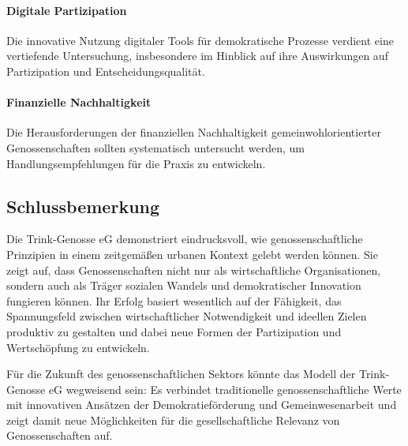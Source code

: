 \paragraph{Digitale Partizipation}
Die innovative Nutzung digitaler Tools für demokratische Prozesse verdient eine vertiefende Untersuchung, insbesondere im Hinblick auf ihre Auswirkungen auf Partizipation und Entscheidungsqualität.

\paragraph{Finanzielle Nachhaltigkeit}
Die Herausforderungen der finanziellen Nachhaltigkeit gemeinwohlorientierter Genossenschaften sollten systematisch untersucht werden, um Handlungsempfehlungen für die Praxis zu entwickeln.

\subsection{Schlussbemerkung}

Die Trink-Genosse eG demonstriert eindrucksvoll, wie genossenschaftliche Prinzipien in einem zeitgemäßen urbanen Kontext gelebt werden können. Sie zeigt auf, dass Genossenschaften nicht nur als wirtschaftliche Organisationen, sondern auch als Träger sozialen Wandels und demokratischer Innovation fungieren können. Ihr Erfolg basiert wesentlich auf der Fähigkeit, das Spannungsfeld zwischen wirtschaftlicher Notwendigkeit und ideellen Zielen produktiv zu gestalten und dabei neue Formen der Partizipation und Wertschöpfung zu entwickeln.

Für die Zukunft des genossenschaftlichen Sektors könnte das Modell der Trink-Genosse eG wegweisend sein: Es verbindet traditionelle genossenschaftliche Werte mit innovativen Ansätzen der Demokratieförderung und Gemeinwesenarbeit und zeigt damit neue Möglichkeiten für die gesellschaftliche Relevanz von Genossenschaften auf.
